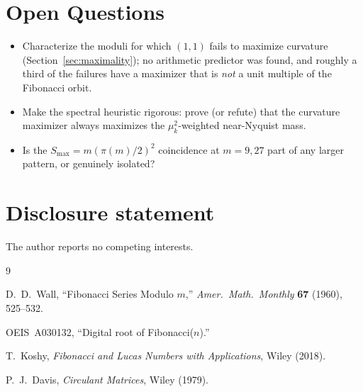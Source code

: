 \documentclass[12pt]{article}
\theoremstyle{remark}
\begin{document}
\section{Open Questions}\label{sec:open}

\begin{itemize}
\item Characterize the moduli for which $(1,1)$ fails to maximize curvature
(Section~\ref{sec:maximality}); no arithmetic predictor was found, and roughly a third of
the failures have a maximizer that is \emph{not} a unit multiple of the Fibonacci orbit.
\item Make the spectral heuristic rigorous: prove (or refute) that the curvature
maximizer always maximizes the $\mu_k^2$-weighted near-Nyquist mass.
\item Is the $S_{\max}=m(\pi(m)/2)^2$ coincidence at $m=9,27$ part of any larger pattern,
or genuinely isolated?
\end{itemize}

\section*{Disclosure statement}
\noindent The author reports no competing interests.

\begin{thebibliography}{9}

D.~D.~Wall,
``Fibonacci Series Modulo $m$,''
\textit{Amer.\ Math.\ Monthly} \textbf{67} (1960), 525--532.

OEIS~A030132, ``Digital root of Fibonacci($n$).''

T.~Koshy,
\textit{Fibonacci and Lucas Numbers with Applications},
Wiley (2018).

P.~J.~Davis,
\textit{Circulant Matrices},
Wiley (1979).

\end{thebibliography}
\end{document}
